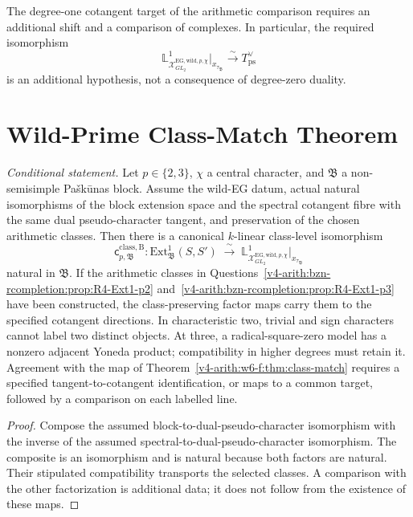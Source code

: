 The degree-one cotangent target of the arithmetic comparison requires
an additional shift and a comparison of complexes. In particular,
the required isomorphism
\begin{equation}
\label{v4-arith:w10-b:eq:spectral-ps}
 \mathbb L^1_{\mathcal X^{\mathrm{EG,wild},p,\chi}_{GL_2}}
 \big|_{x_{\tau_{\mathfrak B}}}
 \xrightarrow{\sim}T_{\mathrm{ps}}^\vee
\end{equation}
is an additional hypothesis, not a consequence of degree-zero duality.

\section{Wild-Prime Class-Match Theorem}
\label{v4-arith:w10-b:main-thm}

\begin{theorem}
\label{v4-arith:w10-b:thm:class-match}
\emph{Conditional statement.} Let \(p\in\{2,3\}\), \(\chi\) a central
character, and \(\mathfrak{B}\) a non-semisimple Pa{\v s}k{\=u}nas block.
Assume the wild-EG datum, actual natural isomorphisms of the
block extension space and the spectral cotangent fibre with the
same dual pseudo-character tangent, and preservation of the chosen
arithmetic classes. Then there is a
canonical \(k\)-linear class-level isomorphism
\begin{equation}
\label{v4-arith:w10-b:eq:class-match}
\mathsf{c}^{\mathrm{class},\mathrm{B}}_{p,\mathfrak{B}}\colon
\mathrm{Ext}^{1}_{\mathfrak{B}}(S,S')\;\xrightarrow{\;\sim\;}\;\mathbb{L}^{1}_{\mathcal{X}^{\mathrm{EG,wild},p,\chi}_{GL_{2}}}\big|_{x_{\tau_{\mathfrak{B}}}}
\end{equation}
natural in \(\mathfrak B\). If the arithmetic classes in
Questions~\ref{v4-arith:bzn-rcompletion:prop:R4-Ext1-p2}
and~\ref{v4-arith:bzn-rcompletion:prop:R4-Ext1-p3} have been
constructed, the class-preserving factor maps carry them to the
specified cotangent directions. In characteristic two, trivial and
sign characters cannot label two distinct objects. At three, a
radical-square-zero model has a nonzero adjacent Yoneda product;
compatibility in higher degrees must retain it.
Agreement with the map of
Theorem~\ref{v4-arith:w6-f:thm:class-match} requires a specified tangent-to-cotangent identification, or maps to
a common target, followed by a comparison on each labelled line.
\end{theorem}

\begin{proof}
Compose the assumed block-to-dual-pseudo-character isomorphism
with the inverse of the assumed spectral-to-dual-pseudo-character
isomorphism. The composite is an isomorphism and is natural because
both factors are natural. Their stipulated compatibility transports
the selected classes. A comparison with the other factorization is
additional data; it does not follow from the existence of these maps.
\end{proof}


